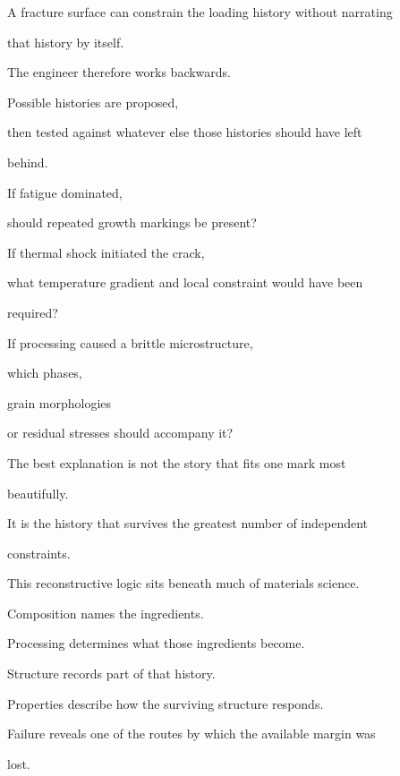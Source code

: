\documentclass[11pt,a4paper,oneside]{report}
\begin{document}
A fracture surface can constrain the loading history without narrating

that history by itself.



The engineer therefore works backwards.



Possible histories are proposed,

then tested against whatever else those histories should have left

behind.



If fatigue dominated,

should repeated growth markings be present?



If thermal shock initiated the crack,

what temperature gradient and local constraint would have been

required?



If processing caused a brittle microstructure,

which phases,

grain morphologies

or residual stresses should accompany it?



The best explanation is not the story that fits one mark most

beautifully.



It is the history that survives the greatest number of independent

constraints.



This reconstructive logic sits beneath much of materials science.



Composition names the ingredients.



Processing determines what those ingredients become.



Structure records part of that history.



Properties describe how the surviving structure responds.



Failure reveals one of the routes by which the available margin was

lost.
\end{document}
